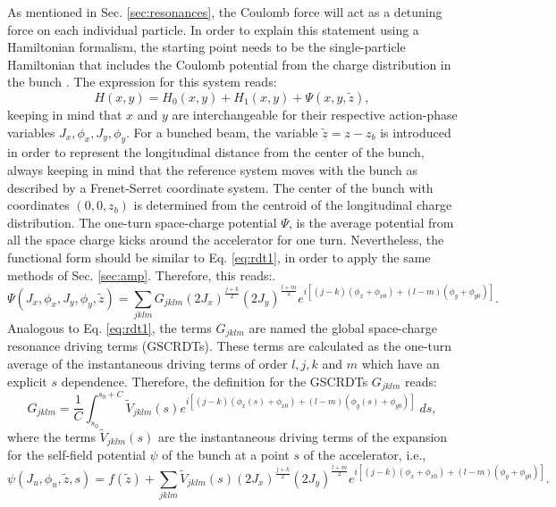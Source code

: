 As mentioned in Sec. \ref{sec:resonances}, the Coulomb force will act as a detuning force on each individual particle. In order to explain this statement using a Hamiltonian formalism, the starting point needs to be the single-particle Hamiltonian that includes the Coulomb potential from the charge distribution in the bunch \cite{witchcraft}. The expression for this system reads:
\begin{equation}
    \label{eq:hpsi}
    H(x,y)=H_{0}(x,y)+H_{1}(x,y)+\Psi(x,y,\tilde{z}), 
\end{equation}     
keeping in mind that $x$ and $y$ are interchangeable for their respective action-phase variables $J_x,\phi_x,J_y, \phi_y$. For a bunched beam, the variable $\tilde{z}=z-z_b$ is introduced in order to represent the longitudinal distance from the center of the bunch, always keeping in mind that the reference system moves with the bunch as described by a Frenet-Serret coordinate system. The center of the bunch with coordinates $(0,0,z_b)$ is determined from the centroid of the longitudinal charge distribution. The one-turn space-charge potential $\Psi$, is the average potential from all the space charge kicks around the accelerator for one turn. Nevertheless, the functional form should be similar to Eq. \ref{eq:rdt1}, in order to apply the same methods of Sec. \ref{sec:amp}. Therefore, this reads:.
\begin{equation}
    \label{eq:scpot1}
    \Psi(J_x,\phi_x,J_y, \phi_y,\tilde{z})= \sum_{jklm} G_{jklm} \left( 2 J_x\right)^{\frac{j+k}{2}} \left( 2 J_y\right)^{\frac{l+m}{2}} e^{i\left[ \left( j-k \right)\left( \phi_x+\phi_{x0} \right)+ \left( l-m \right) \left( \phi_y+\phi_{y0} \right)\right]}.
\end{equation}
Analogous to Eq. \ref{eq:rdt1}, the terms $G_{jklm}$ are named the global space-charge resonance driving terms (GSCRDTs). These terms are calculated as the one-turn average of the instantaneous driving terms of order $l,j,k$ and $m$ which have an explicit $s$ dependence. Therefore, the definition for the GSCRDTs $G_{jklm}$ reads:
\begin{equation}
    \label{eq:gscrdts}
    G_{jklm}= \frac{1}{C}\int_{s_0}^{s_0+C} \tilde{V}_{jklm}(s) e^{i\left[ \left( j-k \right)\left( \phi_x(s)+\phi_{x0} \right)+ \left( l-m \right) \left( \phi_y(s)+\phi_{y0} \right)\right]} \; ds,
\end{equation}
where the terms $\tilde{V}_{jklm}(s)$ are the instantaneous driving terms of the expansion for the self-field potential $\psi$ of the bunch at a point $s$ of the accelerator, i.e.,
\begin{equation}
    \label{eq:scpot2}
    \psi(J_u,\phi_u,\tilde{z},s)= f(\tilde{z}) + \sum_{jklm} \tilde{V}_{jklm}(s) \left( 2 J_x\right)^{\frac{j+k}{2}} \left( 2 J_y\right)^{\frac{l+m}{2}} e^{i\left[ \left( j-k \right)\left( \phi_x+\phi_{x0} \right)+ \left( l-m \right) \left( \phi_y+\phi_{y0} \right)\right]}.
\end{equation} 

